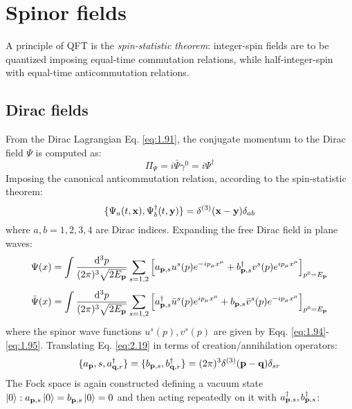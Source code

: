\section{Spinor fields}

A principle of QFT is the \textit{spin-statistic theorem}: integer-spin fields are to be quantized imposing equal-time commutation relations, while half-integer-spin with equal-time anticommutation relations.

\subsection{Dirac fields}

From the Dirac Lagrangian Eq. \ref{eq:1.91}, the conjugate momentum to the Dirac field $ \Psi $ is computed as:
\begin{equation}
  \Pi_\Psi = i \bar{\Psi} \gamma^0 = i \Psi^\dagger
  \label{eq:2.18}
\end{equation}
Imposing the canonical anticommutation relation, according to the spin-statistic theorem:
\begin{equation}
  \{\Psi_a(t,\mathbf{x}) , \Psi_b^\dagger(t,\mathbf{y})\} = \delta^{(3)}(\mathbf{x} - \mathbf{y}) \delta_{ab}
  \label{eq:2.19}
\end{equation}
where $ a,b = 1,2,3,4 $ are Dirac indices. Expanding the free Dirac field in plane waves:
\begin{equation}
  \Psi(x) = \int \frac{\mathrm{d}^3p}{(2\pi)^3 \sqrt{2E_{\mathbf{p}}}} \sum_{s = 1,2} \left[ a_{\mathbf{p},s} u^s(p) e^{-i p_\mu x^\mu} + b_{\mathbf{p},s}^\dagger v^s(p) e^{i p_\mu x^\mu} \right]_{p^0 = E_{\mathbf{p}}}
  \label{eq:2.20}
\end{equation}
\begin{equation}
  \bar{\Psi}(x) = \int \frac{\mathrm{d}^3p}{(2\pi)^3 \sqrt{2E_{\mathbf{p}}}} \sum_{s = 1,2} \left[ a_{\mathbf{p},s}^\dagger \bar{u}^s(p) e^{i p_\mu x^\mu} + b_{\mathbf{p},s} \bar{v}^s(p) e^{-i p_\mu x^\mu} \right]_{p^0 = E_{\mathbf{p}}}
  \label{eq:2.21}
\end{equation}
where the spinor wave functions $ u^s(p) , v^s(p) $ are given by Eqq. \ref{eq:1.94}-\ref{eq:1.95}. Translating Eq. \ref{eq:2.19} in terms of creation/annihilation operators:
\begin{equation}
  \{a_{\mathbf{p}},s , a_{\mathbf{q},r}^\dagger\} = \{b_{\mathbf{p},s} , b_{\mathbf{q},r}^\dagger\} = (2\pi)^3 \delta^{(3)}(\mathbf{p} - \mathbf{q}) \delta_{sr}
  \label{eq:2.22}
\end{equation}
The Fock space is again constructed defining a vacuum state $ \ket{0} : a_{\mathbf{p},s} \ket{0} = b_{\mathbf{p},s} \ket{0} = 0 $ and then acting repeatedly on it with $ a_{\mathbf{p}.s}^\dagger , b_{\mathbf{p},s}^\dagger $:
